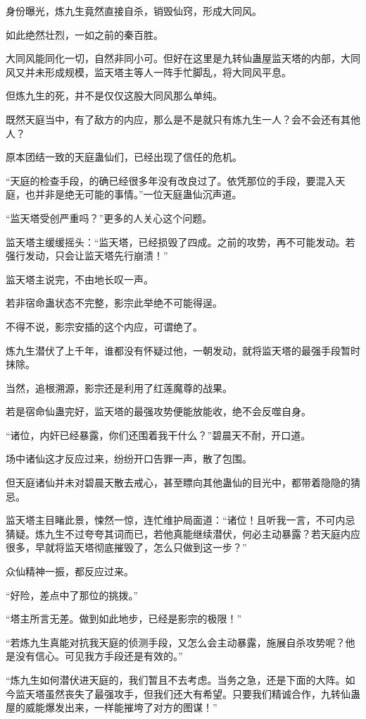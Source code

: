 \begin{this_body}
身份曝光，炼九生竟然直接自杀，销毁仙窍，形成大同风。

如此绝然壮烈，一如之前的秦百胜。

大同风能同化一切，自然非同小可。但好在这里是九转仙蛊屋监天塔的内部，大同风又并未形成规模，监天塔主等人一阵手忙脚乱，将大同风平息。

但炼九生的死，并不是仅仅这股大同风那么单纯。

既然天庭当中，有了敌方的内应，那么是不是就只有炼九生一人？会不会还有其他人？

原本团结一致的天庭蛊仙们，已经出现了信任的危机。

“天庭的检查手段，的确已经很多年没有改良过了。依凭那位的手段，要混入天庭，也并非是绝无可能的事情。”一位天庭蛊仙沉声道。

“监天塔受创严重吗？”更多的人关心这个问题。

监天塔主缓缓摇头：“监天塔，已经损毁了四成。之前的攻势，再不可能发动。若强行发动，只会让监天塔先行崩溃！”

监天塔主说完，不由地长叹一声。

若非宿命蛊状态不完整，影宗此举绝不可能得逞。

不得不说，影宗安插的这个内应，可谓绝了。

炼九生潜伏了上千年，谁都没有怀疑过他，一朝发动，就将监天塔的最强手段暂时抹除。

当然，追根溯源，影宗还是利用了红莲魔尊的战果。

若是宿命仙蛊完好，监天塔的最强攻势便能放能收，绝不会反噬自身。

“诸位，内奸已经暴露，你们还围着我干什么？”碧晨天不耐，开口道。

场中诸仙这才反应过来，纷纷开口告罪一声，散了包围。

但天庭诸仙并未对碧晨天散去戒心，甚至瞟向其他蛊仙的目光中，都带着隐隐的猜忌。

监天塔主目睹此景，悚然一惊，连忙维护局面道：“诸位！且听我一言，不可内忌猜疑。炼九生不过夸夸其词而已，若他真能继续潜伏，何必主动暴露？若天庭内应很多，早就将监天塔彻底摧毁了，怎么只做到这一步？”

众仙精神一振，都反应过来。

“好险，差点中了那位的挑拨。”

“塔主所言无差。做到如此地步，已经是影宗的极限！”

“若炼九生真能对抗我天庭的侦测手段，又怎么会主动暴露，施展自杀攻势呢？他是没有信心。可见我方手段还是有效的。”

“炼九生如何潜伏进天庭的，我们暂且不去考虑。当务之急，还是下面的大阵。如今监天塔虽然丧失了最强攻手，但我们还大有希望。只要我们精诚合作，九转仙蛊屋的威能爆发出来，一样能摧垮了对方的图谋！”


\end{this_body}
